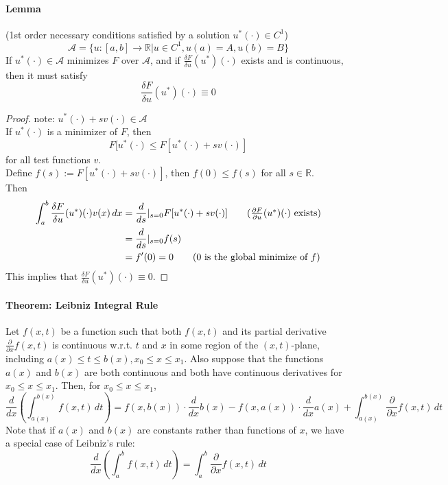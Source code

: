 \documentclass[11pt]{article}
\newcommand{\mc}[1]{\mathcal{#1}}
\newcommand{\real}[0]{\mathbb{R}}
\begin{document}
\paragraph{Lemma}(1st order necessary conditions satisfied by a solution $u^*(\cdot) \in C^1$)
$$\mc{A} = \{ u: [a,b] \rightarrow \real | u \in C^1, u(a) = A, u(b) = B\}$$
If $u^*(\cdot) \in \mc{A}$ minimizes $F$ over $\mc{A}$, and if $\frac{\delta F}{\delta u}(u^*)(\cdot)$ exists and is continuous, then it must satisfy
$$\frac{\delta F}{\delta u}(u^*)(\cdot) \equiv 0$$
\begin{proof}
	note: $u^*(\cdot) + sv(\cdot) \in \mc{A}$ \\
	If $u^*(\cdot)$ is a minimizer of $F$, then
	$$F[u^*(\cdot) \leq F[u^*(\cdot) + sv(\cdot)]$$
	for all test functions $v$. \\
	Define $f(s) := F[u^*(\cdot) + sv(\cdot)]$, then $f(0) \leq f(s)$ for all $s \in \real$. \\
	Then 
	\begin{align}
		\int_a^b \frac{\delta F}{\delta u}(u^*)(\cdot)v(x) \, dx
		&= \frac{d}{ds}|_{s=0} F[u^*(\cdot) + sv(\cdot)] \tag{$\frac{\partial F}{\partial u}(u^*)(\cdot)$ exists} \\
		&= \frac{d}{ds}|_{s=0} f(s)\\
		&= f'(0) = 0 \tag{0 is the global minimize of $f$}
	\end{align}
	This implies that $\frac{\delta F}{\delta u}(u^*)(\cdot) \equiv 0$.
\end{proof}

\paragraph{Theorem: Leibniz Integral Rule}
Let $f(x,t)$ be a function such that both $f(x,t)$ and its partial derivative  $\frac{\partial}{\partial x} f(x,t)$ is continuous w.r.t. $t$ and $x$ in some region of the $(x,t)$-plane, including $a(x) \leq t \leq b(x), x_0 \leq x \leq x_1$. Also suppose that the functions $a(x)$ and $b(x)$ are both continuous and both have continuous derivatives for $x_0 \leq x \leq x_1$. Then, for $x_0 \leq x \leq x_1$,
$$\frac{d}{dx}\left(\int_{a(x)}^{b(x)} f(x,t) \, dt\right) = f(x, b(x))\cdot \frac{d}{dx} b(x) - f(x, a(x)) \cdot \frac{d}{dx} a(x) + \int_{a(x)}^{b(x)} \frac{\partial}{\partial x} f(x,t) \, dt$$
Note that if $a(x)$ and $b(x)$ are constants rather than functions of $x$, we have a special case of Leibniz's rule:
$$\frac{d}{dx} \left( \int_a^b f(x,t)\, dt\right) = \int_a^b \frac{\partial}{\partial x} f(x,t)\, dt$$
\end{document}
